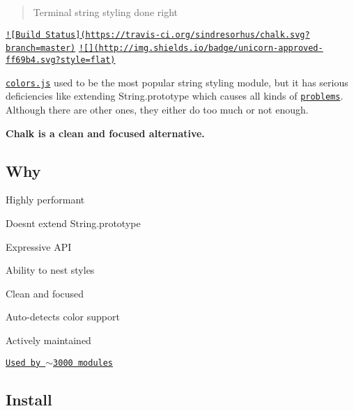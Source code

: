 \section*{~\newline
  ~\newline
 ~\newline
 }

\begin{quote}
Terminal string styling done right \end{quote}


\href{https://travis-ci.org/sindresorhus/chalk}{\tt !\mbox{[}Build Status\mbox{]}(https\+://travis-\/ci.\+org/sindresorhus/chalk.\+svg?branch=master)} \href{https://www.youtube.com/watch?v=Sm368W0OsHo}{\tt !\mbox{[}\mbox{]}(http\+://img.\+shields.\+io/badge/unicorn-\/approved-\/ff69b4.\+svg?style=flat)}

\href{https://github.com/Marak/colors.js}{\tt colors.\+js} used to be the most popular string styling module, but it has serious deficiencies like extending {\ttfamily String.\+prototype} which causes all kinds of \href{https://github.com/yeoman/yo/issues/68}{\tt problems}. Although there are other ones, they either do too much or not enough.

{\bfseries Chalk is a clean and focused alternative.}



\subsection*{Why}


\begin{DoxyItemize}
\item Highly performant
\item Doesn\textquotesingle{}t extend {\ttfamily String.\+prototype}
\item Expressive A\+P\+I
\item Ability to nest styles
\item Clean and focused
\item Auto-\/detects color support
\item Actively maintained
\item \href{https://www.npmjs.com/browse/depended/chalk}{\tt Used by $\sim$3000 modules}
\end{DoxyItemize}

\subsection*{Install}


